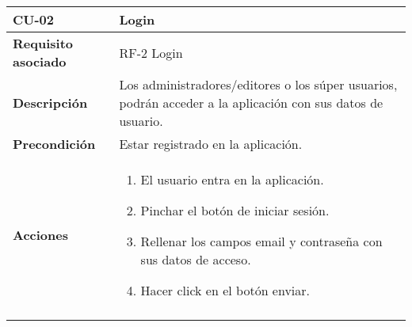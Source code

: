 \newpage
\begin{longtable}[H]{@{}ll@{}}
\toprule
\begin{minipage}[b]{0.23\columnwidth}\raggedright\strut
\textbf{CU-02}\strut
\end{minipage} & \begin{minipage}[b]{0.71\columnwidth}\raggedright\strut
\textbf{Login}\strut
\end{minipage}\tabularnewline
\midrule
\endhead
\begin{minipage}[t]{0.23\columnwidth}\raggedright\strut
\textbf{Requisito asociado}\strut
\end{minipage} & \begin{minipage}[t]{0.71\columnwidth}\raggedright\strut
RF-2 Login\strut
\end{minipage}\tabularnewline
\begin{minipage}[t]{0.23\columnwidth}\raggedright\strut
\textbf{Descripción}\strut
\end{minipage} & \begin{minipage}[t]{0.71\columnwidth}\raggedright\strut
Los administradores/editores o los súper usuarios, podrán acceder a la aplicación con sus datos de usuario.
\strut
\end{minipage}\tabularnewline
\begin{minipage}[t]{0.23\columnwidth}\raggedright\strut
\textbf{Precondición}\strut
\end{minipage} & \begin{minipage}[t]{0.71\columnwidth}\raggedright\strut
Estar registrado en la aplicación.\strut
\end{minipage}\tabularnewline
\begin{minipage}[t]{0.23\columnwidth}\raggedright\strut
\textbf{Acciones}\strut
\end{minipage} & \begin{minipage}[t]{0.71\columnwidth}\raggedright\strut
\begin{enumerate}
\def\labelenumi{\arabic{enumi}.}
\tightlist
\item
  El usuario entra en la aplicación.
\item
  Pinchar el botón de iniciar sesión.
\item
Rellenar los campos email y contraseña con sus datos de acceso.
\item
Hacer click en el botón enviar.
\end{enumerate}\strut
\end{minipage}\tabularnewline
\begin{minipage}[t]{0.23\columnwidth}\raggedright\strut

\end{minipage}
\end{longtable}
